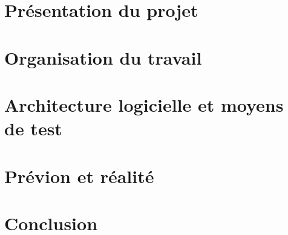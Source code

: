 \documentclass[a4paper,11pt]{article}
\begin{document}
\pagestyle{plain}


\makeTitlePage %

\clearpage

\selectfont

\tableofcontents

\clearpage

\section{Présentation du projet}


\section{Organisation du travail}


\section{Architecture logicielle et moyens de test}


\section{Prévion et réalité}


\section{Conclusion}


\makeAbstractPage
\pagestyle{empty}
\end{document}
